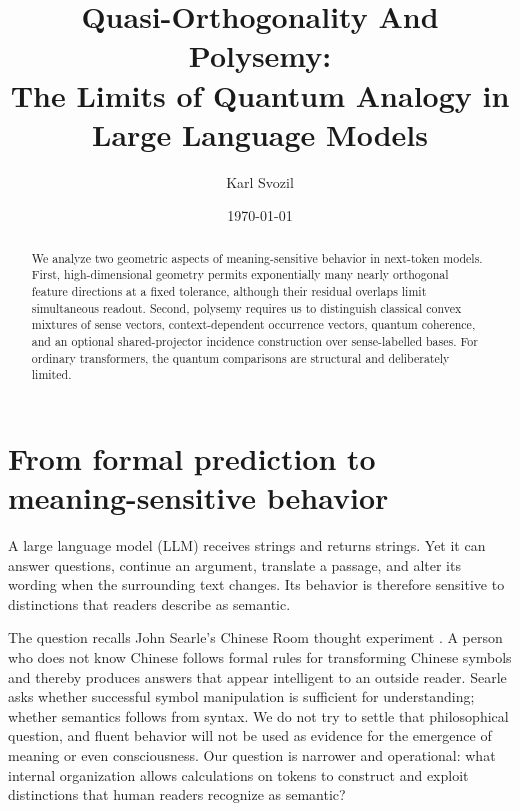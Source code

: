 \documentclass[
  aps,
  reprint,
  superscriptaddress,
  floatfix,
  nofootinbib,
  longbibliography
]{revtex4-2}
\begin{document}
\title{Quasi-Orthogonality And Polysemy:\\
The Limits of Quantum Analogy in Large Language Models}

\author{Karl Svozil}

\date{\today}

\begin{abstract}
We analyze two geometric aspects of meaning-sensitive behavior in next-token
models.  First, high-dimensional geometry permits exponentially many nearly
orthogonal feature directions at a fixed tolerance, although their residual
overlaps limit simultaneous readout.  Second, polysemy requires us to
distinguish classical convex mixtures of sense vectors, context-dependent
occurrence vectors, quantum coherence, and an optional shared-projector
incidence construction over sense-labelled bases.  For ordinary transformers,
the quantum comparisons are structural and deliberately limited.
\end{abstract}

\maketitle

\section{From formal prediction to meaning-sensitive behavior}
\label{sec:puzzle}

A large language model (LLM) receives strings and returns strings.  Yet it can
answer questions, continue an argument, translate a passage, and alter its
wording when the surrounding text changes.  Its behavior is therefore
sensitive to distinctions that readers describe as semantic.

The question recalls John Searle's Chinese Room thought experiment
\cite{searl-80a}.  A person who does not know Chinese follows formal rules for
transforming Chinese symbols and thereby produces answers that appear
intelligent to an outside reader.  Searle asks whether successful symbol
manipulation is sufficient for understanding; whether semantics follows from syntax.  We do not try to settle that
philosophical question, and fluent behavior will not be used as evidence for the emergence of meaning or even
consciousness.  Our question is narrower and operational: what internal
organization allows calculations on tokens to construct and exploit distinctions that
human readers recognize as semantic?
\end{document}
